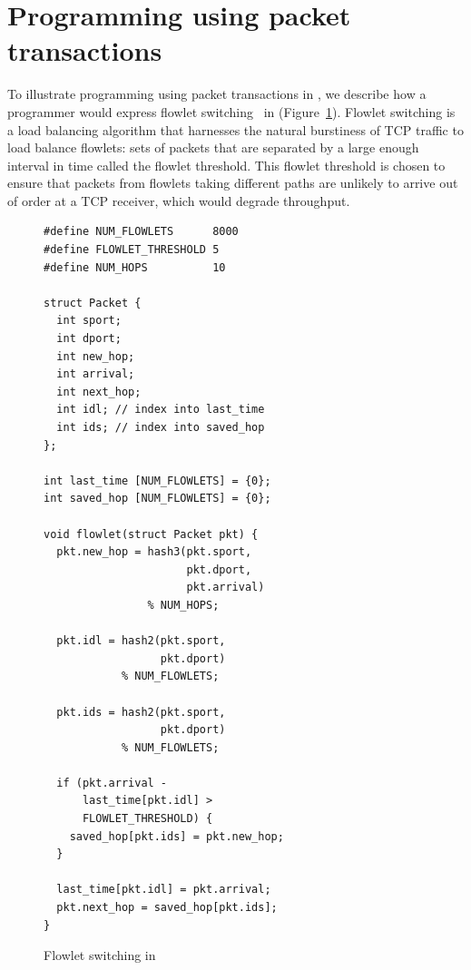 \section{Programming using packet transactions}
\label{s:transactions}

To illustrate programming using packet transactions in \pktlanguage, we
describe how a programmer would express flowlet switching~\cite{flowlets} in
\pktlanguage (Figure~\ref{fig:flowlet}).  Flowlet switching is a load balancing
algorithm that harnesses the natural burstiness of TCP traffic to load balance
flowlets: sets of packets that are separated by a large enough interval in time
called the flowlet threshold.  This flowlet threshold is chosen to ensure that
packets from flowlets taking different paths are unlikely to arrive out of
order at a TCP receiver, which would degrade throughput.

\begin{figure}[!h]
\begin{small}
\begin{lstlisting}[style=customc]
#define NUM_FLOWLETS      8000
#define FLOWLET_THRESHOLD 5
#define NUM_HOPS          10

struct Packet {
  int sport;
  int dport;
  int new_hop;
  int arrival;
  int next_hop;
  int idl; // index into last_time
  int ids; // index into saved_hop
};

int last_time [NUM_FLOWLETS] = {0};
int saved_hop [NUM_FLOWLETS] = {0};

void flowlet(struct Packet pkt) {
  pkt.new_hop = hash3(pkt.sport,
                      pkt.dport,
                      pkt.arrival)
                % NUM_HOPS;

  pkt.idl = hash2(pkt.sport,
                  pkt.dport)
            % NUM_FLOWLETS;

  pkt.ids = hash2(pkt.sport,
                  pkt.dport)
            % NUM_FLOWLETS;

  if (pkt.arrival -
      last_time[pkt.idl] >
      FLOWLET_THRESHOLD) {
    saved_hop[pkt.ids] = pkt.new_hop;
  }

  last_time[pkt.idl] = pkt.arrival;
  pkt.next_hop = saved_hop[pkt.ids];
}
\end{lstlisting}
\end{small}
\caption{Flowlet switching in \pktlanguage}
\label{fig:flowlet}
\end{figure}

